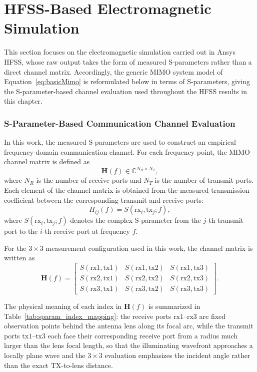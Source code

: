 \section{HFSS-Based Electromagnetic Simulation}
This section focuses on the electromagnetic simulation carried out in Ansys HFSS, whose raw output takes the form of measured S-parameters rather than a direct channel matrix. Accordingly, the generic MIMO system model of Equation~\ref{eq:basicMimo} is reformulated below in terms of S-parameters, giving the S-parameter-based channel evaluation used throughout the HFSS results in this chapter.

\subsubsection{S-Parameter-Based Communication Channel Evaluation}

In this work, the measured S-parameters are used to construct an empirical frequency-domain communication channel.
For each frequency point, the MIMO channel matrix is defined as
\begin{equation}
    \mathbf{H}(f) \in \mathbb{C}^{N_R \times N_T},
\end{equation}
where \(N_R\) is the number of receive ports and \(N_T\) is the number of transmit ports.
Each element of the channel matrix is obtained from the measured transmission coefficient between the corresponding transmit and receive ports:
\begin{equation}
    H_{ij}(f) = S(\mathrm{rx}_i,\mathrm{tx}_j;f),
\end{equation}
where \(S(\mathrm{rx}_i,\mathrm{tx}_j;f)\) denotes the complex S-parameter from the \(j\)-th transmit port to the \(i\)-th receive port at frequency \(f\).

For the \(3 \times 3\) measurement configuration used in this work, the channel matrix is written as
\begin{equation}
\mathbf{H}(f)
=
\begin{bmatrix}
S(\mathrm{rx1},\mathrm{tx1}) & S(\mathrm{rx1},\mathrm{tx2}) & S(\mathrm{rx1},\mathrm{tx3}) \\
S(\mathrm{rx2},\mathrm{tx1}) & S(\mathrm{rx2},\mathrm{tx2}) & S(\mathrm{rx2},\mathrm{tx3}) \\
S(\mathrm{rx3},\mathrm{tx1}) & S(\mathrm{rx3},\mathrm{tx2}) & S(\mathrm{rx3},\mathrm{tx3})
\end{bmatrix}.
\end{equation}

The physical meaning of each index in $\mathbf{H}(f)$ is summarized in Table~\ref{tab:sparam_index_mapping}: the receive ports $\mathrm{rx1}$--$\mathrm{rx3}$ are fixed observation points behind the antenna lens along its focal arc, while the transmit ports $\mathrm{tx1}$--$\mathrm{tx3}$ each face their corresponding receive port from a radius much larger than the lens focal length, so that the illuminating wavefront approaches a locally plane wave and the $3\times3$ evaluation emphasizes the incident angle rather than the exact TX-to-lens distance.

